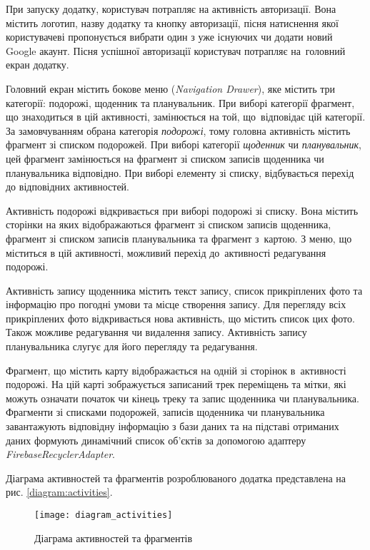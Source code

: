 \documentclass[../main.tex]{subfiles}
\begin{document}
При запуску додатку, користувач потрапляє на активність авторизації. Вона містить логотип, назву додатку та кнопку авторизації, пісня натиснення якої  користувачеві пропонується вибрати один з уже існуючих чи додати новий Google акаунт. Пісня успішної авторизації користувач потрапляє на~головний екран додатку.

Головний екран містить бокове меню (\textit{Navigation Drawer}), яке містить три категорії: подорожі, щоденник та планувальник. При виборі категорії фрагмент, що знаходиться в цій активності, замінюється на той, що~відповідає цій категорії. За замовчуванням обрана категорія \textit{подорожі}, тому головна активність містить фрагмент зі списком подорожей. При виборі категорії \textit{щоденник} чи \textit{планувальник}, цей фрагмент замінюється на фрагмент зі списком записів щоденника чи планувальника відповідно. При виборі елементу зі списку, відбувається перехід до відповідних активностей.

Активність подорожі відкривається при виборі подорожі зі списку. Вона містить сторінки на яких відображаються фрагмент зі списком записів щоденника, фрагмент зі списком записів планувальника та фрагмент з~картою. З меню, що міститься в цій активності, можливий перехід до~активності редагування подорожі.

Активність запису щоденника містить текст запису, список прикріплених фото та інформацію про погодні умови та місце створення запису. Для перегляду всіх прикріплених фото відкривається нова активність, що містить список цих фото. Також можливе редагування чи видалення запису. Активність запису планувальника слугує для його перегляду та редагування.

Фрагмент, що містить карту відображається на одній зі сторінок в~активності подорожі. На цій карті зображується записаний трек переміщень та мітки, які можуть означати початок чи кінець треку та запис щоденника чи планувальника. Фрагменти зі списками подорожей, записів щоденника чи планувальника завантажують відповідну інформацію з бази даних та на підставі отриманих даних формують динамічний список об'єктів за допомогою адаптеру \textit{FirebaseRecyclerAdapter}.

Діаграма активностей та фрагментів розроблюваного додатка представлена на рис. \ref{diagram:activities}.

\begin{figure}[H]
	\centering
	\texttt{[image: diagram\_activities]}
	\caption{Діаграма активностей та фрагментів}
\end{figure}
\end{document}
